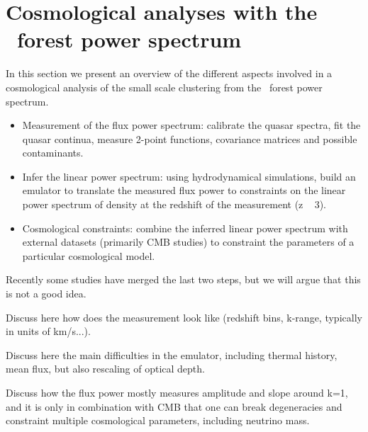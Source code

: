 \section{Cosmological analyses with the \lya\ forest power spectrum}
\label{sec:over}

In this section we present an overview of the different aspects involved in 
a cosmological analysis of the small scale clustering from the \lya\ forest
power spectrum.

\begin{itemize}
 \item Measurement of the flux power spectrum: calibrate the quasar spectra, 
  fit the quasar continua, measure 2-point functions, covariance matrices 
  and possible contaminants.
 \item Infer the linear power spectrum: using hydrodynamical simulations, 
  build an emulator to translate the measured flux power to constraints 
  on the linear power spectrum of density at the redshift of the measurement
  (z ~ 3).
 \item Cosmological constraints: combine the inferred linear power spectrum
  with external datasets (primarily CMB studies) to constraint the parameters
  of a particular cosmological model.
\end{itemize}

Recently some studies have merged the last two steps, but we will argue that
this is not a good idea. 

Discuss here how does the measurement look like (redshift bins, k-range, 
typically in units of km/s...).

Discuss here the main difficulties in the emulator, including thermal history, 
mean flux, but also rescaling of optical depth. 

Discuss how the flux power mostly measures amplitude and slope around k=1, and 
it is only in combination with CMB that one can break degeneracies and 
constraint multiple cosmological parameters, including neutrino mass. 

